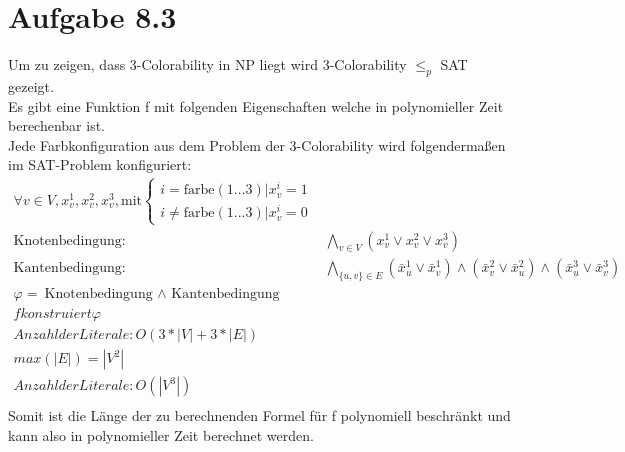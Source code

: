 \documentclass{article}
\begin{document}
	\section[a 8.3]{Aufgabe 8.3}
	Um zu zeigen, dass 3-Colorability in NP liegt wird 3-Colorability $\leq_p$ SAT gezeigt.\\
	Es gibt eine Funktion f mit folgenden Eigenschaften welche in polynomieller Zeit berechenbar ist.\\
	Jede Farbkonfiguration aus dem Problem der 3-Colorability wird folgendermaßen im SAT-Problem konfiguriert: 
	\begin{align*}
	\forall v \in V, x^1_v,x^2_v,x^3_v,\text{mit} \begin{cases}
	i = \text{farbe}(1...3)|  x^i_v = 1\\
	i \neq \text{farbe}(1...3)|  x^i_v = 0
	\end{cases}\\
	\text{Knotenbedingung: }& \bigwedge_{v \in V} (x^1_v \vee x^2_v \vee x^3_v)\\
	\text{Kantenbedingung: }& \bigwedge_{\{u,v\} \in E} (\bar{x}^1_u \vee \bar{x}^1_v) \wedge ( \bar{x}^2_v \vee \bar{x}^2_u) \wedge (\bar{x}^3_u \vee \bar{x}^3_v)\\
	\varphi = \text{Knotenbedingung $\wedge$ Kantenbedingung}\\
	f konstruiert \varphi\\
	Anzahl der Literale: O(3*|V|+3*|E|)\\
	max(|E|) = |V^2|\\
	Anzahl der Literale: O(|V^3|)\\
	\end{align*}
	Somit ist die Länge der zu berechnenden Formel für f polynomiell beschränkt und kann also in polynomieller Zeit berechnet werden.\\
	
\end{document}
